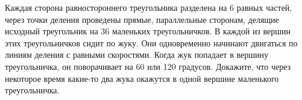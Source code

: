 \begin{problems}
\item
Каждая сторона равностороннего треугольника разделена на 6 равных частей, через
точки деления проведены прямые, параллельные сторонам, делящие исходный
треугольник на 36 маленьких треугольничков.
В каждой из вершин этих треугольничков сидит по жуку.
Они одновременно начинают двигаться по линиям деления с равными скоростями.
Когда жук попадает в вершину треугольничка, он поворачивает на 60 или 120
градусов.
Докажите, что через некоторое время какие-то два жука окажутся в одной вершине
маленького треугольничка.

\end{problems}
